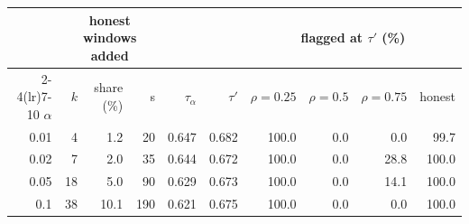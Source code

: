 \begin{tabular}{rrrrrrrrrr}
\toprule
 & \multicolumn{3}{c}{honest windows added} & & & \multicolumn{4}{c}{flagged at $\tau'$ (\%)} \\
\cmidrule(lr){2-4}\cmidrule(lr){7-10}
$\alpha$ & $k$ & share (\%) & s & $\tau_\alpha$ & $\tau'$ & $\rho = 0.25$ & $\rho = 0.5$ & $\rho = 0.75$ & honest \\
\midrule
0.01 & 4 & 1.2 & 20 & 0.647 & 0.682 & 100.0 & 0.0 & 0.0 & 99.7 \\
0.02 & 7 & 2.0 & 35 & 0.644 & 0.672 & 100.0 & 0.0 & 28.8 & 100.0 \\
0.05 & 18 & 5.0 & 90 & 0.629 & 0.673 & 100.0 & 0.0 & 14.1 & 100.0 \\
0.1 & 38 & 10.1 & 190 & 0.621 & 0.675 & 100.0 & 0.0 & 0.0 & 100.0 \\
\bottomrule
\end{tabular}
